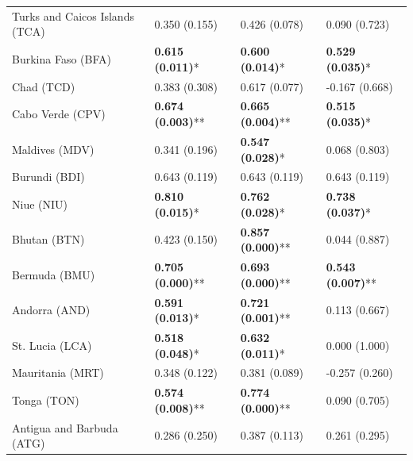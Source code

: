 \begin{longtable}{p{5cm}p{3cm}p{3cm}p{5cm}}
Turks and Caicos Islands (TCA) & \textcolor{atlOrange600}{0.350 (0.155)} & \textcolor{atlOrange600}{0.426 (0.078)} & \textcolor{atlOrange600}{0.090 (0.723)} \\
Burkina Faso (BFA) & \textcolor{atlLime600}{\textbf{0.615 (0.011)}*} & \textcolor{atlLime600}{\textbf{0.600 (0.014)}*} & \textcolor{atlLime600}{\textbf{0.529 (0.035)}*} \\
Chad (TCD) & \textcolor{atlOrange600}{0.383 (0.308)} & \textcolor{atlOrange600}{0.617 (0.077)} & \textcolor{atlOrange600}{-0.167 (0.668)} \\
Cabo Verde (CPV) & \textcolor{atlLime600}{\textbf{0.674 (0.003)}**} & \textcolor{atlLime600}{\textbf{0.665 (0.004)}**} & \textcolor{atlLime600}{\textbf{0.515 (0.035)}*} \\
Maldives (MDV) & \textcolor{atlOrange600}{0.341 (0.196)} & \textcolor{atlLime600}{\textbf{0.547 (0.028)}*} & \textcolor{atlOrange600}{0.068 (0.803)} \\
Burundi (BDI) & \textcolor{atlOrange600}{0.643 (0.119)} & \textcolor{atlOrange600}{0.643 (0.119)} & \textcolor{atlOrange600}{0.643 (0.119)} \\
Niue (NIU) & \textcolor{atlLime600}{\textbf{0.810 (0.015)}*} & \textcolor{atlLime600}{\textbf{0.762 (0.028)}*} & \textcolor{atlLime600}{\textbf{0.738 (0.037)}*} \\
Bhutan (BTN) & \textcolor{atlOrange600}{0.423 (0.150)} & \textcolor{atlLime600}{\textbf{0.857 (0.000)}**} & \textcolor{atlOrange600}{0.044 (0.887)} \\
Bermuda (BMU) & \textcolor{atlLime600}{\textbf{0.705 (0.000)}**} & \textcolor{atlLime600}{\textbf{0.693 (0.000)}**} & \textcolor{atlLime600}{\textbf{0.543 (0.007)}**} \\
Andorra (AND) & \textcolor{atlLime600}{\textbf{0.591 (0.013)}*} & \textcolor{atlLime600}{\textbf{0.721 (0.001)}**} & \textcolor{atlOrange600}{0.113 (0.667)} \\
St. Lucia (LCA) & \textcolor{atlLime600}{\textbf{0.518 (0.048)}*} & \textcolor{atlLime600}{\textbf{0.632 (0.011)}*} & \textcolor{atlOrange600}{0.000 (1.000)} \\
Mauritania (MRT) & \textcolor{atlOrange600}{0.348 (0.122)} & \textcolor{atlOrange600}{0.381 (0.089)} & \textcolor{atlOrange600}{-0.257 (0.260)} \\
Tonga (TON) & \textcolor{atlLime600}{\textbf{0.574 (0.008)}**} & \textcolor{atlLime600}{\textbf{0.774 (0.000)}**} & \textcolor{atlOrange600}{0.090 (0.705)} \\
Antigua and Barbuda (ATG) & \textcolor{atlOrange600}{0.286 (0.250)} & \textcolor{atlOrange600}{0.387 (0.113)} & \textcolor{atlOrange600}{0.261 (0.295)} \\

\end{longtable}
